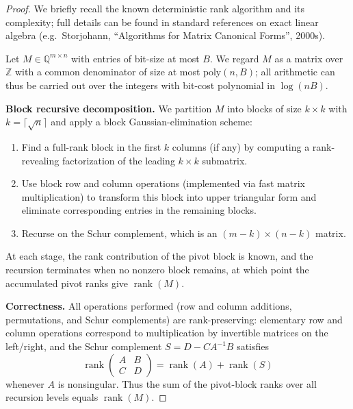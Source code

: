 \documentclass[12pt]{article}
\DeclareMathOperator{\rank}{rank}
\theoremstyle{definition}
\theoremstyle{definition}
\theoremstyle{remark}
\theoremstyle{remark}
\begin{document}
\begin{proof}
We briefly recall the known deterministic rank algorithm and its complexity;
full details can be found in standard references on exact linear algebra
(e.g.\ Storjohann, ``Algorithms for Matrix Canonical Forms'', 2000s).

Let $M \in \mathbb{Q}^{m\times n}$ with entries of bit-size at most $B$.
We regard $M$ as a matrix over $\mathbb{Z}$ with a common denominator
of size at most $\mathrm{poly}(n,B)$; all arithmetic can thus be carried
out over the integers with bit-cost polynomial in $\log(nB)$.

\medskip
\noindent\textbf{Block recursive decomposition.}
We partition $M$ into blocks of size $k\times k$ with
$k = \lceil \sqrt{n}\rceil$ and apply a block Gaussian-elimination scheme:
\begin{enumerate}
  \item Find a full-rank block in the first $k$ columns (if any) by
        computing a rank-revealing factorization of the leading
        $k \times k$ submatrix.
  \item Use block row and column operations (implemented via fast
        matrix multiplication) to transform this block into upper
        triangular form and eliminate corresponding entries in the
        remaining blocks.
  \item Recurse on the Schur complement, which is an $(m-k)\times(n-k)$
        matrix.
\end{enumerate}
At each stage, the rank contribution of the pivot block is known, and
the recursion terminates when no nonzero block remains, at which point
the accumulated pivot ranks give $\rank(M)$.

\medskip
\noindent\textbf{Correctness.}
All operations performed (row and column additions, permutations, and
Schur complements) are rank-preserving:
elementary row and column operations correspond to multiplication by
invertible matrices on the left/right, and the Schur complement
$S = D - C A^{-1} B$ satisfies
\[
  \rank \begin{pmatrix} A & B \\ C & D \end{pmatrix}
  = \rank(A) + \rank(S)
\]
whenever $A$ is nonsingular.
Thus the sum of the pivot-block ranks over all recursion levels equals
$\rank(M)$.


\end{proof}
\end{document}
